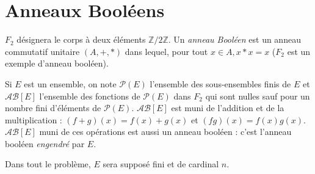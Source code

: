 \section{Anneaux Booléens}

$F_2$ désignera le corps à deux éléments $\mathbb{Z}/2\mathbb{Z}$. Un \textit{anneau Booléen} est un anneau commutatif unitaire $(A, +, *)$ dans lequel, pour tout $x\in A, x*x=x$ ($F_2$ est un exemple d'anneau booléen).
\medskip

Si $E$ est un ensemble, on note $\mathcal{P}(E)$ l'ensemble des sous-ensembles finis de $E$ et $\mathcal{AB}[E]$ l'ensemble des fonctions de $\mathcal{P}(E)$ dans $F_2$ qui sont nulles sauf pour un nombre fini d'éléments de $\mathcal{P}(E)$. $\mathcal{AB}[E]$ est muni de l'addition et de la multiplication : $(f+g)(x)=f(x)+g(x)$ et $(fg)(x)=f(x)g(x)$. $\mathcal{AB}[E]$ muni de ces opérations est aussi un anneau booléen : c'est l'anneau booléen \textit{engendré} par $E$.
\medskip

Dans tout le problème, $E$ sera supposé fini et de cardinal $n$.